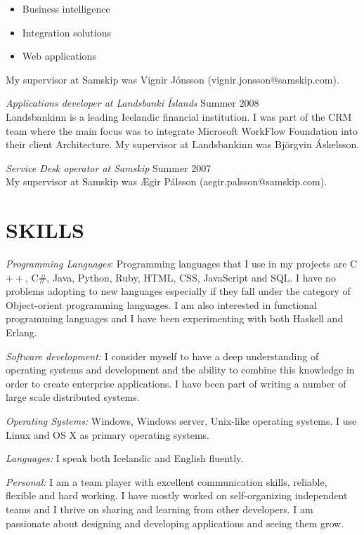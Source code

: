 \documentclass[margin]{res}
\begin{document}
\begin{resume}
\begin{itemize}
\item Business intelligence
\item Integration solutions
\item Web applications
\end{itemize}

My supervisor at Samskip was Vignir Jónsson (vignir.jonsson@samskip.com).

{\sl Applications developer at Landsbanki Íslands} \hfill Summer 2008 \\
Landsbankinn is a leading Icelandic financial institution. I was part of the
CRM team where the main focus was to integrate Microsoft WorkFlow Foundation
into their client Architecture.  My supervisor at Landsbankinn was Björgvin
Áskelsson.

{\sl Service Desk operator at Samskip} \hfill Summer 2007 \\
My supervisor at Samskip was Ægir Pálsson (aegir.palsson@samskip.com).


\section{SKILLS} 
{\sl Programming Languages}: Programming languages that I use in my projects
are C$++$, C\#, Java, Python, Ruby, HTML, CSS, JavaScript and SQL. I have no
problems adopting to new languages especially if they fall under the category
of Object-orient programming languages. I am also interested in functional
programming languages and I have been experimenting with both Haskell and
Erlang.

{\sl Software development:}
I consider myself to have a deep understanding of operating systems and
development and the ability to combine this knowledge in order to create
enterprise applications. I have been part of writing a number of large scale
distributed systems.

{\sl Operating Systems:} Windows, Windows server, Unix-like operating systems.
I use Linux and OS X as primary operating systems.

{\sl Languages:} I speak both Icelandic and English fluently.

{\sl Personal:}
I am a team player with excellent communication skills, reliable, flexible and
hard working. I have mostly worked on self-organizing independent teams and I
thrive on sharing and learning from other developers. I am passionate about
designing and developing applications and seeing them grow.


\end{resume}
\end{document}
